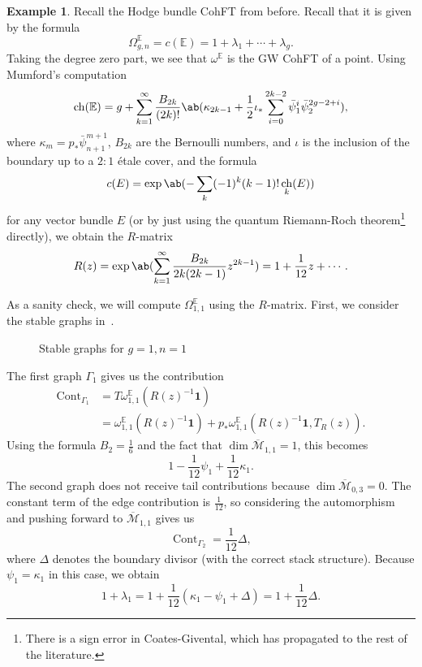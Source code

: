 \documentclass[10pt,oldfontcommands,oneside]{memoir}
\theoremstyle{definition}
\newtheorem{exm}[thm]{Example}
\theoremstyle{remark}
\theoremstyle{plain}
\theoremstyle{definition}
\theoremstyle{remark}
\newcommand{\E}{\mathbb{E}}
\newcommand{\Mbar}{\overline{\mathcal{M}}}
\newcommand{\1}{\mathbf{1}}
\newcommand{\2}{\mathbf{2}}
\newcommand{\3}{\mathbf{3}}
\DeclareMathOperator{\ch}{ch}
\DeclareMathOperator{\Cont}{Cont}
\begin{document}
\begin{exm}
    Recall the Hodge bundle CohFT from before. Recall that it is given by the formula
    \[ \Omega^{\E}_{g,n} = c(\E) = 1 + \lambda_1 + \cdots + \lambda_g. \]
    Taking the degree zero part, we see that $\omega^{\E}$ is the GW CohFT of a point. Using Mumford's computation
    \[ \ch(\E) = g + \sum_{k=1}^{\infty} \frac{B_{2k}}{(2k)!}\ab(\kappa_{2k-1} + \frac{1}{2}\iota_*\sum_{i=0}^{2k-2} \bar{\psi}_1^{i} \bar{\psi}_2^{2g-2+i}), \]
    where $\kappa_{m} = p_* \bar{\psi}_{n+1}^{m+1}$, $B_{2k}$ are the Bernoulli numbers, and $\iota$ is the inclusion of the boundary up to a $2:1$ \'etale cover, and the formula
    \[ c(E) = \exp \ab(-\sum_k (-1)^k (k-1)!\ch_k(E)) \]
    for any vector bundle $E$ (or by just using the quantum Riemann-Roch theorem\footnote{There is a sign error in Coates-Givental, which has propagated to the rest of the literature.} directly), we obtain the $R$-matrix
    \[ R(z) = \exp\ab( \sum_{k=1}^{\infty} \frac{B_{2k}}{2k(2k-1)} z^{2k-1}) = 1+\frac{1}{12}z + \cdots. \]

    As a sanity check, we will compute $\Omega_{1,1}^{\E}$ using the $R$-matrix. First, we consider the stable graphs in~.
    \begin{figure}[htpb]
    \begin{center}
    \end{center}
    \caption{Stable graphs for $g=1, n=1$}%
    \label{fig:03graphloop}
    \end{figure}
    The first graph $\Gamma_1$ gives us the contribution
    \begin{align*}
        \Cont_{\Gamma_1} &= T\omega_{1,1}^{\E}(R(z)^{-1}\1) \\
        &= \omega_{1,1}^{\E}(R(z)^{-1}\1) + p_* \omega_{1,1}^{\E}(R(z)^{-1}\1, T_R(z)).
    \end{align*}
    Using the formula $B_2 = \frac{1}{6}$ and the fact that $\dim \Mbar_{1,1} = 1$, this becomes
    \[ 1 - \frac{1}{12}\psi_1 + \frac{1}{12} \kappa_1. \]
    The second graph does not receive tail contributions because $\dim \Mbar_{0,3} = 0$. The constant term of the edge contribution is $\frac{1}{12}$, so considering the automorphism and pushing forward to $\Mbar_{1,1}$ gives us
    \[ \Cont_{\Gamma_2} = \frac{1}{12} \Delta, \]
    where $\Delta$ denotes the boundary divisor (with the correct stack structure). Because $\psi_1 = \kappa_1$ in this case, we obtain
    \[ 1+\lambda_1 = 1 + \frac{1}{12}(\kappa_1 - \psi_1 + \Delta) = 1 + \frac{1}{12} \Delta. \]
\end{exm}
\end{document}
